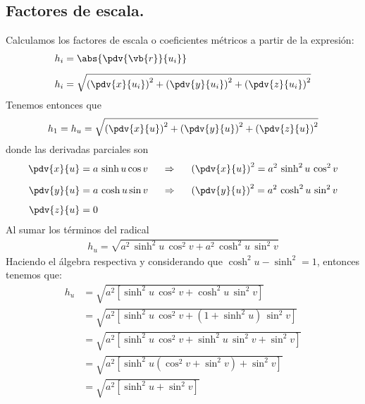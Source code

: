 \subsection{Factores de escala.}
Calculamos los factores de escala o coeficientes métricos a partir de la expresión:
\begin{align*}
h_{i} &= \abs{\pdv{\vb{r}}{u_{i}}} \\[0.5em]
h_{i} &= \sqrt{ \left( \pdv{x}{u_{i}} \right)^{2} + \left( \pdv{y}{u_{i}} \right)^{2} + \left( \pdv{z}{u_{i}} \right)^{2}}
\end{align*}
Tenemos entonces que
\begin{align*}
h_{1} = h_{u} = \sqrt{ \left( \pdv{x}{u} \right)^{2} + \left( \pdv{y}{u} \right)^{2} + \left( \pdv{z}{u} \right)^{2}}
\end{align*}
donde las derivadas parciales son
\fontsize{12}{12}\selectfont
\begin{align*}
\pdv{x}{u} &= a \, \sinh u \cos v \hspace{0.5cm} \Rightarrow \hspace{0.5cm} \left( \pdv{x}{u} \right)^{2} = a^{2} \, \sinh^{2} u \, \cos^{2} v \\[0.5em]
\pdv{y}{u} &= a \, \cosh u \sin v \hspace{0.5cm} \Rightarrow \hspace{0.5cm} \left( \pdv{y}{u} \right)^{2} = a^{2} \, \cosh^{2} u \, \sin^{2} v \\[0.5em]
\pdv{z}{u} &= 0
\end{align*}
Al sumar los términos del radical
\begin{align*}
h_{u} = \sqrt{a^{2} \, \sinh^{2} u \, \cos^{2} v + a^{2} \, \cosh^{2} u \, \sin^{2} v}
\end{align*}
Haciendo el álgebra respectiva y considerando que $\cosh^{2} u - \sinh^{2} = 1$, entonces tenemos que:
\fontsize{12}{12}\selectfont
\begin{align*}
h_{u} &= \sqrt{a^{2} \left[ \sinh^{2} u \, \cos^{2} v + \cosh^{2} u \, \sin^{2} v \right] } \\[0.5em]
&= \sqrt{a^{2} \left[ \sinh^{2} u \, \cos^{2} v + (1 + \sinh^{2} u) \, \sin^{2} v \right] } \\[0.5em]
&= \sqrt{a^{2} \left[ \sinh^{2} u \, \cos^{2} v + \sinh^{2} u \, \sin^{2} v + \sin^{2} v \right] } \\[0.5em]
&= \sqrt{a^{2} \left[ \sinh^{2} u ( \cos^{2} v + \sin^{2} v ) + \sin^{2} v \right] } \\[0.5em]
&= \sqrt{a^{2} \left[ \sinh^{2} u + \sin^{2} v  \right] }
\end{align*}
